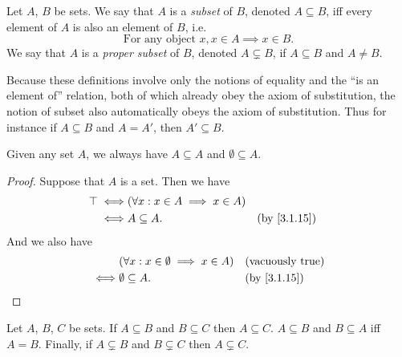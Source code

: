 \begin{defn}[Subsets]\label{3.1.15}
	Let \(A\), \(B\) be sets.
	We say that \(A\) is a \emph{subset} of \(B\), denoted \(A \subseteq B\), iff every element of \(A\) is also an element of \(B\), i.e.
	\[
		\text{For any object } x, x \in A \implies x \in B.
	\]
	We say that \(A\) is a \emph{proper subset} of \(B\), denoted \(A \subsetneq B\), if \(A \subseteq B\) and \(A \neq B\).
\end{defn}

\begin{rmk}\label{3.1.16}
	Because these definitions involve only the notions of equality and the ``is an element of'' relation, both of which already obey the axiom of substitution, the notion of subset also automatically obeys the axiom of substitution.
	Thus for instance if \(A \subseteq B\) and \(A = A'\), then \(A' \subseteq B\).
\end{rmk}

\begin{eg}\label{3.1.17}
	Given any set \(A\), we always have \(A \subseteq A\) and \(\emptyset \subseteq A\).
\end{eg}

\begin{proof}
	Suppose that \(A\) is a set.
	Then we have
	\begin{align*}
		\top \iff & (\forall x : x \in A \implies x \in A)                  \\
		\iff      & A \subseteq A.                         &  & \by{3.1.15}
	\end{align*}
	And we also have
	\begin{align*}
		     & (\forall x : x \in \emptyset \implies x \in A) &  & \text{(vacuously true)} \\
		\iff & \emptyset \subseteq A.                         &  & \by{3.1.15}
	\end{align*}
\end{proof}

\begin{prop}\label{3.1.18}
	Let \(A\), \(B\), \(C\) be sets.
	If \(A \subseteq B\) and \(B \subseteq C\) then \(A \subseteq C\).
	\(A \subseteq B\) and \(B \subseteq A\) iff \(A = B\).
	Finally, if \(A \subsetneq B\) and \(B \subsetneq C\) then \(A \subsetneq C\).
\end{prop}

